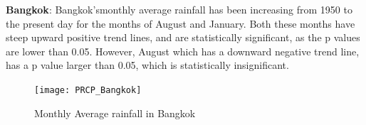\textbf{Bangkok}: Bangkok'smonthly average rainfall has been increasing from 1950 to the present day for the months of August and January. Both these months have steep upward positive trend lines, and are statistically significant, as the p values are lower than 0.05. However, August which has a downward negative trend line, has a p value larger than 0.05, which is statistically insignificant. 

\begin{figure}[h!]
  \centering
  \texttt{[image: PRCP\_Bangkok]}
  \caption{Monthly Average rainfall in Bangkok}
  \label{fig:PRCP_bangkok}
\end{figure}







